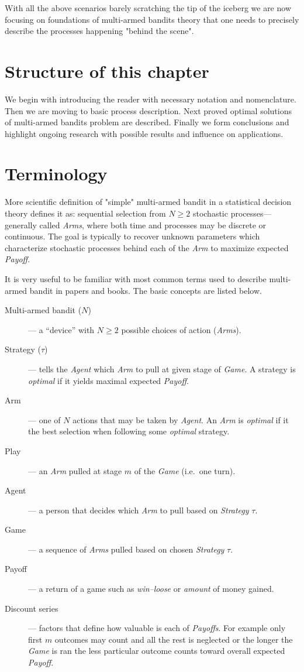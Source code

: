 \documentclass[12pt, a4paper, pdflatex]{report}
\begin{document}
With all the above scenarios barely scratching the tip of the iceberg we are now focusing on foundations of multi-armed bandits theory that one needs to precisely describe the processes happening "behind the scene".

\section{Structure of this chapter}
We begin with introducing the reader with necessary notation and nomenclature. Then we are moving to basic process description. Next proved optimal solutions of multi-armed bandits problem are described. Finally we form conclusions and highlight ongoing research with possible results and influence on applications.


\section{Terminology}
More scientific definition of "simple" multi-armed bandit in a statistical decision theory defines it as: sequential selection from $N \geq 2$ stochastic processes--- generally called \emph{Arms}, where both time and processes may be discrete or continuous. The goal is typically to recover unknown parameters which characterize stochastic processes behind each of the \emph{Arm} to maximize expected \emph{Payoff}.

It is very useful to be familiar with most common terms used to describe multi-armed bandit in papers and books. The basic concepts are listed below.
\begin{description}
\item[Multi-armed bandit ($N$)]--- a ``device'' with $N \geq 2$ possible choices of action (\emph{Arms}).
\item[Strategy ($\tau$)]--- tells the \emph{Agent} which \emph{Arm} to pull at given stage of \emph{Game}. A strategy is \emph{optimal} if it yields maximal expected \emph{Payoff}.
\item[Arm]--- one of $N$ actions that may be taken by \emph{Agent}. An \emph{Arm} is \emph{optimal} if it the best selection when following some \emph{optimal} strategy.
\item[Play]--- an \emph{Arm} pulled at stage $m$ of the \emph{Game} (i.e.\ one turn).
\item[Agent]--- a person that decides which \emph{Arm} to pull based on \emph{Strategy} $\tau$.
\item[Game]--- a sequence of \emph{Arms} pulled based on chosen \emph{Strategy} $\tau$.
\item[Payoff]--- a return of a game such as \emph{win--loose} or \emph{amount} of money gained.
\item[Discount series]--- factors that define how valuable is each of \emph{Payoffs}. For example only first $m$ outcomes may count and all the rest is neglected or the longer the \emph{Game} is ran the less particular outcome counts toward overall expected \emph{Payoff}.
\end{description}
\end{document}
